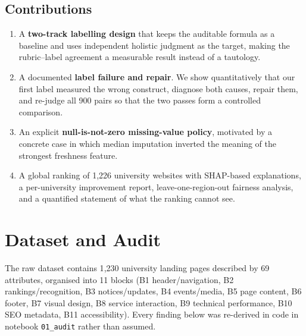 \documentclass[11pt,a4paper]{article}
\begin{document}
\subsection{Contributions}

\begin{enumerate}
\item A \textbf{two-track labelling design} that keeps the auditable formula as a baseline and
      uses independent holistic judgment as the target, making the rubric--label agreement a
      measurable result instead of a tautology.
\item A documented \textbf{label failure and repair}. We show quantitatively that our first
      label measured the wrong construct, diagnose both causes, repair them, and re-judge all
      900 pairs so that the two passes form a controlled comparison.
\item An explicit \textbf{null-is-not-zero missing-value policy}, motivated by a concrete case
      in which median imputation inverted the meaning of the strongest freshness feature.
\item A global ranking of 1{,}226 university websites with SHAP-based explanations, a
      per-university improvement report, leave-one-region-out fairness analysis, and a
      quantified statement of what the ranking cannot see.
\end{enumerate}

\section{Dataset and Audit}

The raw dataset contains 1{,}230 university landing pages described by 69 attributes,
organised into 11 blocks (B1 header/navigation, B2 rankings/recognition, B3 notices/updates,
B4 events/media, B5 page content, B6 footer, B7 visual design, B8 service interaction,
B9 technical performance, B10 SEO metadata, B11 accessibility). Every finding below was
re-derived in code in notebook \texttt{01\_audit} rather than assumed.
\end{document}
